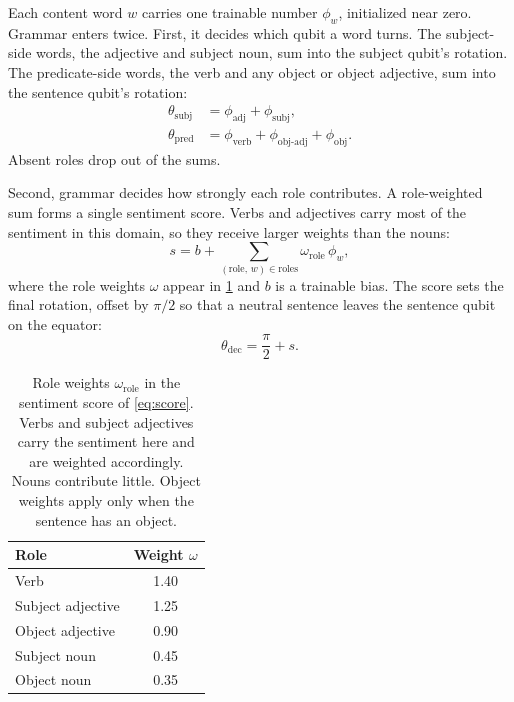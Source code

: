 \documentclass{article}
\begin{document}
Each content word $w$ carries one trainable number $\phi_w$, initialized near
zero. Grammar enters twice. First, it decides which qubit a word turns. The
subject-side words, the adjective and subject noun, sum into the subject qubit's
rotation. The predicate-side words, the verb and any object or object adjective,
sum into the sentence qubit's rotation:
\begin{align}
  \theta_\mathrm{subj} &= \phi_\mathrm{adj} + \phi_\mathrm{subj}, \\
  \theta_\mathrm{pred} &= \phi_\mathrm{verb} + \phi_\mathrm{obj\text{-}adj} + \phi_\mathrm{obj}.
\end{align}
Absent roles drop out of the sums.

Second, grammar decides how strongly each role contributes. A role-weighted sum
forms a single sentiment score. Verbs and adjectives carry most of the sentiment
in this domain, so they receive larger weights than the nouns:
\begin{equation}
  s = b + \sum_{(\text{role},\,w)\in\text{roles}} \omega_\mathrm{role}\,\phi_w,
  \label{eq:score}
\end{equation}
where the role weights $\omega$ appear in \cref{tab:weights} and $b$ is a
trainable bias. The score sets the final rotation, offset by $\pi/2$ so that a
neutral sentence leaves the sentence qubit on the equator:
\begin{equation}
  \theta_\mathrm{dec} = \frac{\pi}{2} + s.
  \label{eq:decision}
\end{equation}

\begin{table}[t]
  \caption{Role weights $\omega_\mathrm{role}$ in the sentiment score of
  \cref{eq:score}. Verbs and subject adjectives carry the sentiment here and are
  weighted accordingly. Nouns contribute little. Object weights apply only when
  the sentence has an object.}
  \label{tab:weights}
  \vskip 0.1in
  \centering
  \begin{tabular}{lc}
    \toprule
    Role & Weight $\omega$ \\
    \midrule
    Verb              & 1.40 \\
    Subject adjective & 1.25 \\
    Object adjective  & 0.90 \\
    Subject noun      & 0.45 \\
    Object noun       & 0.35 \\
    \bottomrule
  \end{tabular}
  \vskip -0.1in
\end{table}
\end{document}
